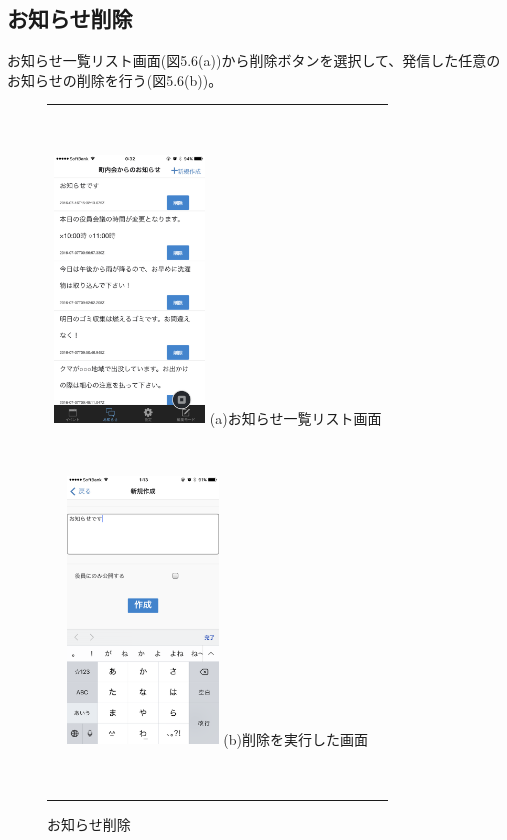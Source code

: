 \subsection{お知らせ削除}%
お知らせ一覧リスト画面(図5.6(a))から削除ボタンを選択して、発信した任意のお知らせの削除を行う(図5.6(b))。
​
\begin{figure}[htbp]
  \begin{center}
    \begin{tabular}{c}
​
      \begin{minipage}{0.33\hsize}
        \begin{center}
\includegraphics[width=4cm]{notification_list_after_add.PNG}
          \hspace{1cm} %
          {\footnotesize (a)お知らせ一覧リスト画面}
        \end{center}
      \end{minipage}
​
      \begin{minipage}{0.33\hsize}
        \begin{center}
\includegraphics[width=4cm]{notification_add.PNG}
          \hspace{1cm}%
          {\footnotesize (b)削除を実行した画面}
        \end{center}
      \end{minipage}
​
    \end{tabular}
    \caption{お知らせ削除}
    \label{fig:lena}
  \end{center}
\end{figure}
​
